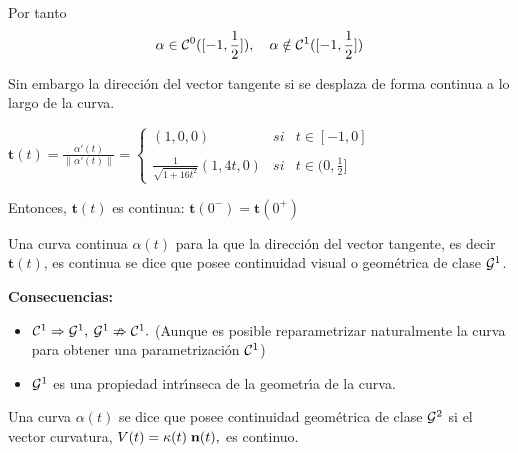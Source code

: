 \documentclass[twoside]{report}
\begin{document}
\vspace{0.3cm}

Por tanto $$\alpha\in {\cal C}^0([-1,\frac{1}{2}]), \quad \alpha\notin {\cal C}^1([-1,\frac{1}{2}])$$

Sin embargo la direcci\'{o}n del vector tangente si se desplaza de forma continua a lo largo de la curva.

$\mathbf{t}(t)=\frac{\alpha'(t)}{\parallel\alpha'(t)\parallel}=\left\{\begin{array}{ccc}
(1,0,0) & si & t\in [-1,0]\\
 & & \\
\displaystyle \frac{1}{\sqrt{1+16t^2}}(1,4t,0) & si & t\in (0,
\frac{1}{2}]
\end{array}\right.$

\vspace{0.3cm}


Entonces, $\mathbf{t}(t)$ es continua: $\mathbf{t}(0^{-})= \mathbf{t}(0^{+})$

\vspace{0.3cm}

\begin{defi} Una curva continua $\alpha(t)$ para la que la direcci\'{o}n del vector tangente, es decir $\mathbf{t}(t)$, es continua se dice que posee continuidad visual o geom\'{e}trica de clase ${\cal G}^1$.
\end{defi}

\vspace{0.3cm}

{\bf Consecuencias:}
\begin{itemize}
\item ${\cal C}^1 \Rightarrow {\cal G}^1,$ \hspace{0.5cm} $ {\cal G}^1 \nRightarrow {\cal C}^1.$ (Aunque es posible reparametrizar naturalmente la curva para obtener una parametrizaci\'{o}n $ {\cal C}^1$)
\item ${\cal G}^1$ es una propiedad intr\'{\i}nseca  de la geometr\'{\i}a de la curva.
\end{itemize}

\vspace{0.3cm}

\begin{defi} Una curva $\alpha(t)$ se dice que posee continuidad geom\'{e}trica de clase ${\cal G}^2$ si el vector curvatura, $V(t)=\kappa(t) \; {\bf n}(t),$ es continuo.
\end{defi}

\vspace{0.5cm}
\end{document}
